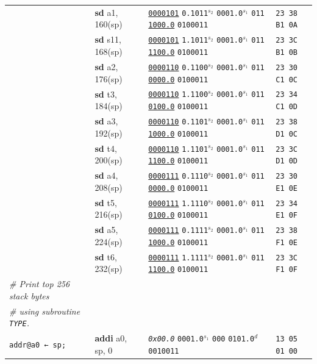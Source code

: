\documentclass[a4paper,12pt,final]{article}
\begin{document}
\begin{table}[!htbp]
\begin{adjustwidth}{-1cm}{-1cm}
\begin{center}
\begin{tabular}{l|ll|l}
 & \textbf{sd} a1,  160(sp) & \uline{\texttt{0000101}} \texttt{0.1011}​\(^{s_{2}}\) \texttt{0001.0}​\(^{s_{1}}\) \texttt{011} \uline{\texttt{1000.0}} \texttt{0100011} & \texttt{23 38 B1 0A}\\[0pt]
 & \textbf{sd} s11, 168(sp) & \uline{\texttt{0000101}} \texttt{1.1011}​\(^{s_{2}}\) \texttt{0001.0}​\(^{s_{1}}\) \texttt{011} \uline{\texttt{1100.0}} \texttt{0100011} & \texttt{23 3C B1 0B}\\[0pt]
 & \textbf{sd} a2,  176(sp) & \uline{\texttt{0000110}} \texttt{0.1100}​\(^{s_{2}}\) \texttt{0001.0}​\(^{s_{1}}\) \texttt{011} \uline{\texttt{0000.0}} \texttt{0100011} & \texttt{23 30 C1 0C}\\[0pt]
 & \textbf{sd} t3,  184(sp) & \uline{\texttt{0000110}} \texttt{1.1100}​\(^{s_{2}}\) \texttt{0001.0}​\(^{s_{1}}\) \texttt{011} \uline{\texttt{0100.0}} \texttt{0100011} & \texttt{23 34 C1 0D}\\[0pt]
 & \textbf{sd} a3,  192(sp) & \uline{\texttt{0000110}} \texttt{0.1101}​\(^{s_{2}}\) \texttt{0001.0}​\(^{s_{1}}\) \texttt{011} \uline{\texttt{1000.0}} \texttt{0100011} & \texttt{23 38 D1 0C}\\[0pt]
 & \textbf{sd} t4,  200(sp) & \uline{\texttt{0000110}} \texttt{1.1101}​\(^{s_{2}}\) \texttt{0001.0}​\(^{s_{1}}\) \texttt{011} \uline{\texttt{1100.0}} \texttt{0100011} & \texttt{23 3C D1 0D}\\[0pt]
 & \textbf{sd} a4,  208(sp) & \uline{\texttt{0000111}} \texttt{0.1110}​\(^{s_{2}}\) \texttt{0001.0}​\(^{s_{1}}\) \texttt{011} \uline{\texttt{0000.0}} \texttt{0100011} & \texttt{23 30 E1 0E}\\[0pt]
 & \textbf{sd} t5,  216(sp) & \uline{\texttt{0000111}} \texttt{1.1110}​\(^{s_{2}}\) \texttt{0001.0}​\(^{s_{1}}\) \texttt{011} \uline{\texttt{0100.0}} \texttt{0100011} & \texttt{23 34 E1 0F}\\[0pt]
 & \textbf{sd} a5,  224(sp) & \uline{\texttt{0000111}} \texttt{0.1111}​\(^{s_{2}}\) \texttt{0001.0}​\(^{s_{1}}\) \texttt{011} \uline{\texttt{1000.0}} \texttt{0100011} & \texttt{23 38 F1 0E}\\[0pt]
 & \textbf{sd} t6,  232(sp) & \uline{\texttt{0000111}} \texttt{1.1111}​\(^{s_{2}}\) \texttt{0001.0}​\(^{s_{1}}\) \texttt{011} \uline{\texttt{1100.0}} \texttt{0100011} & \texttt{23 3C F1 0F}\\[0pt]
\emph{\# Print top 256 stack bytes} &  &  & \\[0pt]
\emph{\# using subroutine \texttt{TYPE}.} &  &  & \\[0pt]
\texttt{addr@a0 ← sp;} & \textbf{addi} a0, sp, 0 & \emph{\texttt{0x00.0}}                    \texttt{0001.0}​\(^{s_{1}}\) \texttt{000} \texttt{0101.0}​\(^{d}\)  \texttt{0010011} & \texttt{13 05 01 00}\\[0pt]

\end{tabular}
\end{center}
\end{adjustwidth}
\end{table}
\end{document}
